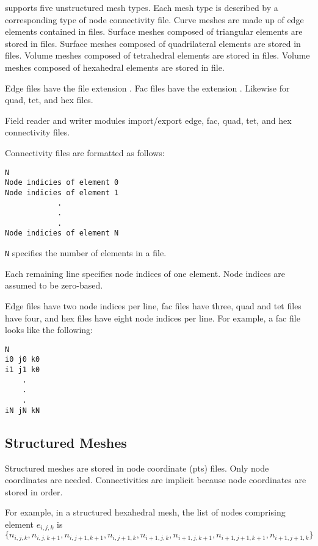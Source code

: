 \sr{} supports five unstructured mesh types.  Each mesh type is
described by a corresponding type of node connectivity file.  Curve
meshes are made up of edge elements contained in  files.
Surface meshes composed of triangular elements are stored in 
files.  Surface meshes composed of quadrilateral elements are stored
in  files.  Volume meshes composed of tetrahedral elements
are stored in  files.  Volume meshes composed of hexahedral
elements are stored in  file.

Edge files have the file extension .  Fac files have
the extension .  Likewise for quad, tet, and hex files.

Field reader and writer modules import/export edge, fac, quad, tet,
and hex connectivity files.

Connectivity files are formatted as follows:

\begin{verbatim}
N
Node indicies of element 0
Node indicies of element 1
            .
            .
            .
Node indicies of element N
\end{verbatim}

\verb|N| specifies the number of elements in a file.

Each  remaining line specifies node indices of one element.
Node indices are assumed to be zero-based.

Edge files have two node indices per line, fac files have three, quad
and tet files have four, and hex files have eight node indices per
line.  For example, a fac file looks like the following:

\begin{verbatim}
N
i0 j0 k0
i1 j1 k0
    .
    .
    .
iN jN kN
\end{verbatim}


\subsection{Structured Meshes}
\label{sec:struct_meshes}

Structured meshes are stored in node coordinate (pts) files.  Only
node coordinates are needed.  Connectivities are implicit because node
coordinates are stored in  order.

For example, in a structured hexahedral mesh, the list of nodes comprising
element \(e_{i,j,k}\) is \(\{n_{i,j,k}, n_{i,j,k+1}, n_{i,j+1,k+1}, n_{i,j+1,k}, n_{i+1,j,k}, n_{i+1,j,k+1}, n_{i+1,j+1,k+1}, n_{i+1,j+1,k}\}\)


